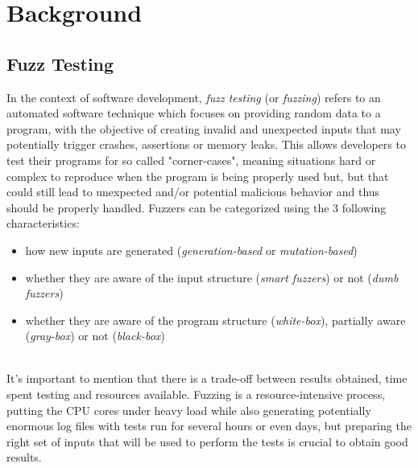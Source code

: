 \chapter{Background} \label{chap_2}





\newpage
\section{Fuzz Testing}
In the context of software development, \textit{fuzz testing} (or \textit{fuzzing}) refers to an automated software technique which focuses on providing random data to a program, with the objective of creating invalid and unexpected inputs that may potentially trigger crashes, assertions or memory leaks.
\newline 
This allows developers to test their programs for so called "corner-cases", meaning situations hard or complex to reproduce when the program is being properly used but, but that could still lead to unexpected and/or potential malicious behavior and thus should be properly handled. 
\newline \newline
Fuzzers can be categorized using the 3 following characteristics:
\begin{itemize}
    \item how new inputs are generated (\textit{generation-based} or \textit{mutation-based})
    \item whether they are aware of the input structure (\textit{smart fuzzers}) or not (\textit{dumb fuzzers})
    \item whether they are aware of the program structure (\textit{white-box}), partially aware (\textit{gray-box}) or not (\textit{black-box})
\end{itemize}
\ \\
It's important to mention that there is a trade-off between results obtained, time spent testing and resources available.
\newline
Fuzzing is a resource-intensive process, putting the CPU cores under heavy load while also generating potentially enormous log files with tests run for several hours or even days, but preparing the right set of inputs that will be used to perform the tests is crucial to obtain good results.
